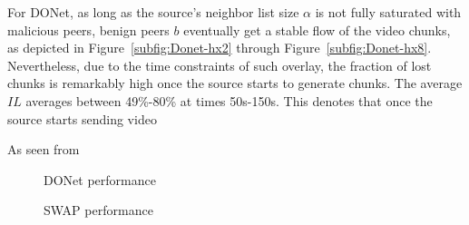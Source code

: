 For DONet, as long as the source's neighbor list size $\alpha$ is not fully saturated with malicious peers, benign peers $b$ eventually get a stable flow of the video chunks, as depicted in Figure~\ref{subfig:Donet-hx2} through Figure~\ref{subfig:Donet-hx8}.
Nevertheless, due to the time constraints of such overlay, the fraction of lost chunks is remarkably high once the source starts to generate chunks. 
The average $IL$ averages between 49\%-80\% at times 50s-150s. 
This denotes that once the source starts sending video 

As seen from 


\begin{figure}[t!]
\centering

  \mbox{}
  \mbox{}
  \mbox{}
  \mbox{}
   
  \caption{DONet performance}

  \label{fig:DONet}
  \end{figure}
  
\begin{figure}[t!]
\centering

  \mbox{}
  \mbox{}
  \mbox{}
  \mbox{}

  
  \caption{SWAP performance}

  \label{fig:swap}
  \end{figure}
    

